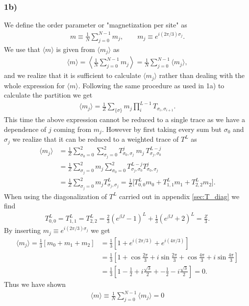 \documentclass[reprint, amsmath, amssymb, aps, onecolumn]{revtex4-2}
\begin{document}
\subsubsection*{1b)}
\noindent We define the order parameter or "magnetization per site" as
\begin{align*}
  m \equiv \frac{1}{N} \sum_{j=0}^{N-1}m_j, \qquad m_j \equiv e^{i (2\pi/3)\sigma_j}.
\end{align*}
We use that $\langle m \rangle$ is given from $\langle m_j \rangle$ as 
\begin{align*}
  \langle m \rangle = \left\langle \frac{1}{N} \sum_{j=0}^{N-1}m_j \right\rangle = \frac{1}{N} \sum_{j=0}^{N-1} \langle m_j \rangle,
\end{align*}
and we realize that it is sufficient to calculate $\langle m_j \rangle$ rather than dealing with the whole expression for $\langle m \rangle$. Following the same procedure as used in 1a) to calculate the partition we get
\begin{align*}
  \langle m_j \rangle = \frac{1}{Z} \sum_{\{\sigma\}} m_j \prod_i^{L-1} T_{\sigma_i, \sigma_{i+1}}.
\end{align*}
This time the above expression cannot be reduced to a single trace as we have a dependence of $j$ coming from $m_j$. However by first taking every sum but $\sigma_0$ and $\sigma_j$ we realize that it can be reduced to a weighted trace of $T^L$ as 
 \begin{align*}
  \langle m_j \rangle &=  \frac{1}{Z} \sum_{\sigma_0=0}^2 \sum_{\sigma_j=0}^2 T_{\sigma_0, \sigma_j}^j \ m_j \ T_{\sigma_j, \sigma_{0}}^{L-j} \\
  &= \frac{1}{Z} \sum_{\sigma_j=0}^2 m_j \sum_{\sigma_0=0}^2   T_{\sigma_j, \sigma_{0}}^{L-j} T_{\sigma_0, \sigma_j}^j  \\
  &= \frac{1}{Z} \sum_{\sigma_j=0}^2 m_j T_{\sigma_j, \sigma_j}^L = \frac{1}{Z}\Big[ T_{0, 0}^L m_0 + T_{1, 1}^L m_1 + T_{2, 2}^L m_2 \Big].
 \end{align*}
When using the diagonalization of $T^L$ carried out in appendix \ref{sec:T_diag} we find 
\begin{align*}
  T_{0, 0}^L = T_{1, 1}^L = T_{2, 2}^L = \frac{2}{3}(e^{\beta J} - 1)^L + \frac{1}{3}(e^{\beta J} + 2)^L = \frac{Z}{3}.
\end{align*}
By inserting $m_j \equiv e^{i (2\pi/3)\sigma_j}$ we get
\begin{align*}
\langle m_j \rangle = \frac{1}{3}[m_0 + m_1 + m_2] &= \frac{1}{3}\left[ 1 + e^{i (2\pi/3)} + e^{i (4\pi/3)} \right] \\
&= \frac{1}{3}\left[1 + \cos{\frac{2\pi}{3}} + i\sin{\frac{2\pi}{3}} + \cos{\frac{4\pi}{3}} + i\sin{\frac{4\pi}{3}} \right] \\
&= \frac{1}{3}\left[1 - \frac{1}{2} + i\frac{\sqrt{3}}{2} + -\frac{1}{2} - i\frac{\sqrt{3}}{2} \right] = 0.
\end{align*}
Thus we have shown 
\begin{align*}
  \langle m \rangle \equiv \frac{1}{N} \sum_{j=0}^{N-1} \langle m_j \rangle = 0 
\end{align*}
%
%
\end{document}
